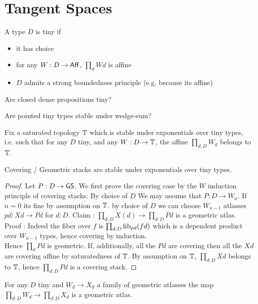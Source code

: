 \section{Tangent Spaces}
\begin{definition}
	A type $D$ is tiny if
	\begin{itemize}
		\item it has choice
		\item for any $W : D \to \mathsf{Aff}$, $\prod_d W d$ is affine
		\item $D$ admits a strong boundedness principle (e.g. because its affine)
	\end{itemize}
\end{definition}
\begin{question}
	Are closed dense propositions tiny?
\end{question}
\begin{question}
	Are pointed tiny types stable under wedge-sum?
\end{question}
Fix a saturated topology $\mathbb{T}$ which is stable under exponentials over tiny types, i.e. such that for any $D$ tiny, and any $W : D \to \mathbb{T}$, the affine $\prod_{d:D} W_d$ belongs to $\mathbb{T}$.
\begin{theorem}
	Covering / Geometric stacks are stable under exponentials over tiny types.
\end{theorem}
\begin{proof}
	Let $P : D \to \mathsf{GS}$. 
	We first prove the covering case by the $W$ induction principle of covering stacks: By choice of $D$ We may assume that $P : D \to W_n$. If $n = 0$ its fine by assumption on $\mathbb{T}$.
	by choice of $D$ we can choose $W_{n-1}$ atlasses $p d : X d \to P d$ for $d : D$.
	Claim :  $\prod_{d: D} X(d) \to \prod_{d : D} P d$ is a geometric atlas.
	Proof : Indeed the fiber over $f$ is $\prod_{d : D} \operatorname{fib}_{p d} (f d)$ which is a dependent product over $W_{n-1}$ types, hence covering by induction. \\
	Hence $\prod_d P d$ is geometric.
	If, additionally, all the $P d$ are covering then all the $X d$ are covering affine by saturatedness of $\mathbb{T}$. By assumption on $\mathbb{T}$, $\prod_{d: D} X d$ belongs to $\mathbb{T}$, hence $\prod_{d: D} P d$ is a covering stack.
\end{proof}
\begin{corollary}{\label{cor:GeomAtlExpStable}}
		For any $D$ tiny and $W_d \to X_d$ a family of geometric atlasses the map $\prod_{d : D} W_d \to \prod_{d: D} X_d$ is a geometric atlas.
\end{corollary}
